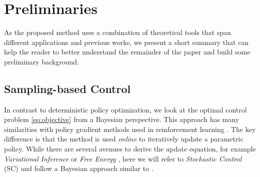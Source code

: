 \section{Preliminaries} \label{sec:theory}

As the proposed method uses a combination of theoretical tools that span different applications and previous works, we present a short summary that can help the reader to better understand the remainder of the paper and build some preliminary background.

\subsection{Sampling-based Control}
In contrast to deterministic policy optimization, we look at the optimal control problem \eqref{eq:objective} from a Bayesian perspective. This approach has many similarities with policy gradient methods used in reinforcement learning \cite{williams1992simple}. The key difference is that the method is used \emph{online} to iteratively update a parametric policy. While there are several avenues to derive the update equation, for example \emph{Variational Inference} \cite{lambert_stein_2020} or \emph{Free Energy} \cite{williams_information_2017}, here we will refer to \emph{Stochastic Control} (SC) and follow a Bayesian approach similar to \cite{levine2018reinforcement}. 

